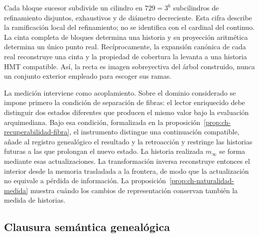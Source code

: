 Cada bloque sucesor subdivide un cilindro en \(729=3^6\) subcilindros de refinamiento disjuntos,
exhaustivos y de diámetro decreciente. Esta cifra describe la ramificación
local del refinamiento; no se identifica con el cardinal del continuo. La
cinta completa de bloques determina una historia y su proyección aritmética
determina un único punto real. Recíprocamente, la expansión canónica de cada
real reconstruye una cinta y la propiedad de cobertura la levanta a una
historia HMT compatible. Así, la recta es imagen sobreyectiva del árbol
construido, nunca un conjunto exterior empleado para escoger sus ramas.

La medición interviene como acoplamiento. Sobre el dominio considerado se
impone primero la condición de separación de fibras: el lector enriquecido
debe distinguir dos estados diferentes que producen el mismo valor bajo la evaluación arquimediana. Bajo esa
condición, formalizada en la
proposición~\ref{prop:ch-recuperabilidad-fibra}, el instrumento distingue una
continuación compatible, añade al registro genealógico el resultado y la
retroacción y restringe las historias futuras a las que prolongan el nuevo
estado. La historia realizada \(m_\infty\) se forma mediante esas
actualizaciones. La transformación inversa reconstruye entonces el interior
desde la memoria trasladada a la frontera, de modo que la actualización no
equivale a pérdida de información. La
proposición~\ref{prop:ch-naturalidad-medida} muestra cuándo los cambios de
representación conservan también la medida de historias.

\subsection{Clausura semántica genealógica}

